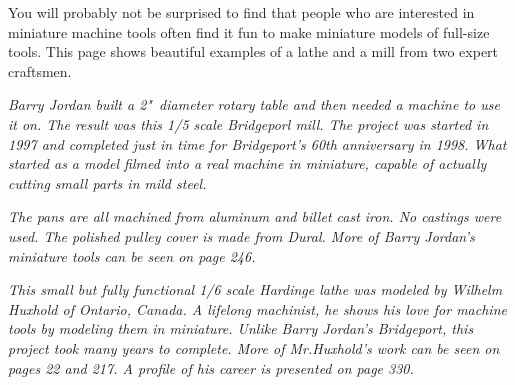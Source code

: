 \secdown
{}\secdown

You will probably not be surprised to find that people who are interested in
miniature machine tools often find it fun to make miniature models of full-size
tools. This page shows beautiful examples of a lathe and a mill from two expert
craftsmen.

\bigskip
\textit{Barry Jordan built a 2"\ diameter rotary table and then needed a machine
to use it on. The result was this 1/5 scale Bridgeporl mill. The project was started in
1997 and completed just in time for Bridgeport's 60th anniversary in 1998. What
started as a model filmed into a real machine in miniature, capable of actually
cutting small parts in mild steel.}

\bigskip
\textit{The pans are all machined from aluminum and billet cast iron. No
castings were used. The polished pulley cover is made from Dural. More of Barry Jordan's
miniature tools can be seen on page 246.}

\bigskip
\textit{This small but fully functional 1/6 scale Hardinge lathe was modeled by
Wilhelm Huxhold of Ontario, Canada. A lifelong machinist, he shows his love for
machine tools by modeling them in miniature. Unlike Barry Jordan's Bridgeport,
this project took many years to complete. More of Mr.Huxhold's work can be seen
on pages 22 and 217. A profile of his career is presented on page 330.}

\secup
\secup
